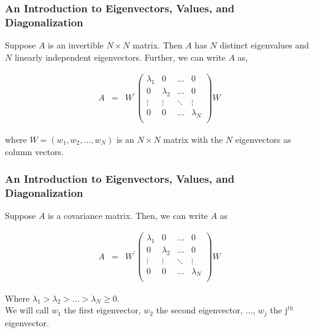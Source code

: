 \begin{frame}[fragile]
\frametitle{An Introduction to Eigenvectors, Values, and Diagonalization}


\begin{thm}
Suppose ${A}$ is an \alert{invertible} $N \times N$ matrix.  Then ${A}$ has $N$ distinct eigenvalues and $N$ linearly independent eigenvectors.  Further, we can write ${A}$ as, 

\begin{eqnarray}
{A} &= & {W}^{'}\begin{pmatrix}
\lambda_{1} & 0 & \hdots & 0 \\
0 & \lambda_{2} & \hdots & 0 \\
\vdots & \vdots & \ddots & \vdots \\
0 & 0&  \hdots & \lambda_{N}\\
\end{pmatrix}
{W} \nonumber 
\end{eqnarray}

where ${W} = \left({w}_{1}, {w}_{2}, \hdots, {w}_{N} \right)$ is an $N \times N$ matrix with the $N$ eigenvectors as column vectors.  

\end{thm}

\end{frame}


\begin{frame}[fragile]
\frametitle{An Introduction to Eigenvectors, Values, and Diagonalization}


\begin{defn}
Suppose $A$ is a covariance matrix.  Then, we can write $A$ as  

\begin{eqnarray}
{A} &= & {W}^{'}\begin{pmatrix}
\lambda_{1} & 0 & \hdots & 0 \\
0 & \lambda_{2} & \hdots & 0 \\
\vdots & \vdots & \ddots & \vdots \\
0 & 0&  \hdots & \lambda_{N}\\
\end{pmatrix}
{W} \nonumber 
\end{eqnarray}

Where $\lambda_{1}>\lambda_{2} > \hdots > \lambda_{N} \geq 0$. \\
We will call ${w}_{1}$ the first eigenvector, ${w}_{2}$ the second eigenvector, ..., ${w}_{j}$ the $\text{j}^{th}$ eigenvector.    

\end{defn}

\end{frame}


